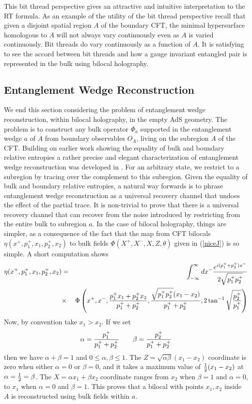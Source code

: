 \documentclass[a4paper,12pt]{article}
\def\bea{\begin{eqnarray}}
\def\eea{\end{eqnarray}}
\begin{document}
This bit thread perspective gives an attractive and intuitive interpretation to the RT formula.
As an example of the utility of the bit thread perspective\cite{Freedman:2016zud,Cui:2018dyq} recall that
given a disjoint spatial region $A$ of the boundary CFT, the minimal hypersurface homologous to $A$ will not always 
vary continuously even as $A$ is varied continuously.
Bit threads do vary continuously as a function of $A$.
It is satisfying to see the accord between bit threads and how a gauge invariant entangled pair is represented in the
bulk using bilocal holography.

\subsection{Entanglement Wedge Reconstruction}

We end this section considering the problem of entanglement wedge reconstruction, within bilocal holography, in
the empty AdS geometry.
The problem is to construct any bulk operator $\Phi_a$ supported in the entanglement wedge $a$ of $A$ from
boundary observables $O_A$, living on the subregion $A$ of the CFT.
Building on earlier work \cite{Jafferis:2015del} showing the equality of bulk and boundary relative entropies a rather 
precise and elegant characterization of entanglement wedge reconstruction was developed in \cite{Cotler:2017erl}.
For an arbitrary state, we restrict to a subregion by tracing over the complement to this subregion.
Given the equality of bulk and boundary relative entropies, a natural way forwards is to phrase entanglement wedge
reconstruction as a universal recovery channel that undoes the effect of the partial trace.
It is non-trivial \cite{Cotler:2017erl} to prove that there is a universal recovery channel that can recover from the noise 
introduced by restricting from the entire bulk to subregion $a$.
In the case of bilocal holography, things are simpler, as a consequence of the fact that the map from CFT
bilocals $\eta(x^+,p_1^+,x_1,p_2^+,x_2)$ to bulk fields $\Phi(X^+,X^-,X,Z,\theta)$ given in (\ref{niceJ}) is so simple.
A short computation shows
%
\bea
\eta(x^+,p_1^+,x_1,p_2^+,x_2)&=&\int_{-\infty}^\infty dx^- {e^{i(p_1^++p_2^+)x^-}\over 2\sqrt{p_1^+p_2^+}}\cr
&\times& \Phi\left(x^+,x^-,{p_1^+x_1+p_2^+x_2\over p_1^++p_2^+},
{\sqrt{p_1^+p_2^+}(x_1-x_2)\over p_1^++p_2^+},2\tan^{-1}\sqrt{p_2^+\over p_1^+}\right)
\eea
%
Now, by convention take $x_1>x_2$.
If we set
%
\bea
\alpha={p_1^+\over p_1^++p_2^+}\qquad
\beta={p_2^+\over p_1^++p_2^+}
\eea
%
then we have $\alpha+\beta=1$ and $0\le \alpha,\beta\le 1$.
The $Z=\sqrt{\alpha\beta}(x_1-x_2)$ coordinate is zero when either $\alpha=0$ or $\beta=0$, and it takes a maximum
value of ${1\over 2}(x_1-x_2)$ at $\alpha={1\over 2}=\beta$.
The $X=\alpha x_1+\beta x_2$ coordinate ranges from $x_2$ when $\beta=1$ and $\alpha=0$, to $x_1$ when 
$\alpha=0$ and $\beta=1$.
This proves that a bilocal with points $x_1,x_2$ inside $A$ is reconstructed using bulk fields within $a$.
\end{document}
